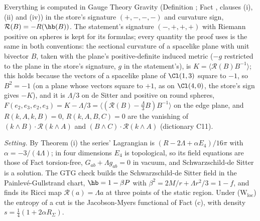 Everything is computed in Gauge Theory Gravity (Definition ; Fact , clauses (i), (ii) and (iv)) in the store's signature $(+,-,-,-)$ and curvature sign, $\mathcal{R}(B) = -R(\hb(B))$. The statement's signature $(-,+,+,+)$ with Riemann positive on spheres is kept for its formulas; every quantity the proof uses is the same in both conventions: the sectional curvature of a spacelike plane with unit bivector $B$, taken with the plane's positive-definite induced metric ($-g$ restricted to the plane in the store's signature, $g$ in the statement's), is $K = \langle\mathcal{R}(B)B^{-1}\rangle$; this holds because the vectors of a spacelike plane of $\Cl(1,3)$ square to $-1$, so $B^{2} = -1$ (on a plane whose vectors square to $+1$, as on $\Cl(4,0)$, the store's sign gives $-K$), and it is $\Lambda/3$ on de Sitter and positive on round spheres, $F(e_{2}, e_{3}, e_{2}, e_{3}) = K - \Lambda/3 = \langle(\mathcal{R}(B) - \tfrac{\Lambda}{3}B)B^{-1}\rangle$ on the edge plane, and $R(k, A, k, B) = 0$, $R(k, A, B, C) = 0$ are the vanishing of $(k\wedge B)\cdot\mathcal{R}(k\wedge A)$ and $(B\wedge C)\cdot\mathcal{R}(k\wedge A)$ (dictionary C11).

\emph{Setting.} By Theorem (i) the series' Lagrangian is $(R - 2\Lambda + \alpha E_{4})/16\pi$ with $\alpha = -3/(4\Lambda)$; in four dimensions $E_{4}$ is topological, so its field equations are those of Fact  torsion-free, $G_{ab} + \Lambda g_{ab} = 0$ in vacuum, and Schwarzschild-de Sitter is a solution. The GTG check builds the Schwarzschild-de Sitter field in the Painlev\'e-Gullstrand chart, $\hb = 1 - \beta P$ with $\beta^{2} = 2M/r + \Lambda r^{2}/3 = 1 - f$, and finds its Ricci map $\mathcal{R}(a) = \Lambda a$ at three points of the static region. Under (W$_{\mathrm{loc}}$) the entropy of a cut is the Jacobson-Myers functional of Fact (c), with density $s = \tfrac14(1 + 2\alpha R_{\Sigma})$.

